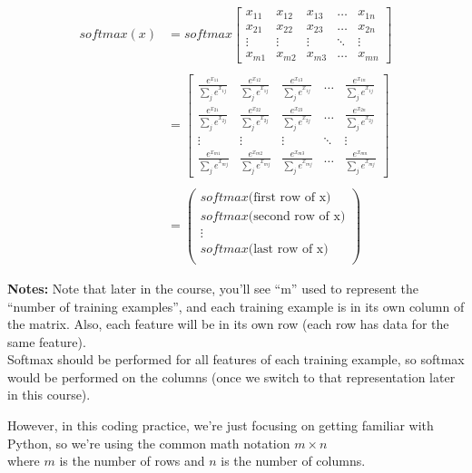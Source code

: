 \documentclass[11pt]{article}
\begin{document}
\begin{align*}
softmax(x) &= softmax\begin{bmatrix}
            x_{11} & x_{12} & x_{13} & \dots  & x_{1n} \\
            x_{21} & x_{22} & x_{23} & \dots  & x_{2n} \\
            \vdots & \vdots & \vdots & \ddots & \vdots \\
            x_{m1} & x_{m2} & x_{m3} & \dots  & x_{mn}
            \end{bmatrix} \\ \\&= 
 \begin{bmatrix}
    \frac{e^{x_{11}}}{\sum_{j}e^{x_{1j}}} & \frac{e^{x_{12}}}{\sum_{j}e^{x_{1j}}} & \frac{e^{x_{13}}}{\sum_{j}e^{x_{1j}}} & \dots  & \frac{e^{x_{1n}}}{\sum_{j}e^{x_{1j}}} \\
    \frac{e^{x_{21}}}{\sum_{j}e^{x_{2j}}} & \frac{e^{x_{22}}}{\sum_{j}e^{x_{2j}}} & \frac{e^{x_{23}}}{\sum_{j}e^{x_{2j}}} & \dots  & \frac{e^{x_{2n}}}{\sum_{j}e^{x_{2j}}} \\
    \vdots & \vdots & \vdots & \ddots & \vdots \\
    \frac{e^{x_{m1}}}{\sum_{j}e^{x_{mj}}} & \frac{e^{x_{m2}}}{\sum_{j}e^{x_{mj}}} & \frac{e^{x_{m3}}}{\sum_{j}e^{x_{mj}}} & \dots  & \frac{e^{x_{mn}}}{\sum_{j}e^{x_{mj}}}
\end{bmatrix} \\ \\ &= \begin{pmatrix}
    softmax\text{(first row of x)}  \\
    softmax\text{(second row of x)} \\
    \vdots  \\
    softmax\text{(last row of x)} \\
\end{pmatrix} 
\end{align*}

    \textbf{Notes:} Note that later in the course, you'll see ``m'' used to
represent the ``number of training examples'', and each training example
is in its own column of the matrix. Also, each feature will be in its
own row (each row has data for the same feature).\\
Softmax should be performed for all features of each training example,
so softmax would be performed on the columns (once we switch to that
representation later in this course).

However, in this coding practice, we're just focusing on getting
familiar with Python, so we're using the common math notation
\(m \times n\)\\
where \(m\) is the number of rows and \(n\) is the number of columns.
\end{document}
